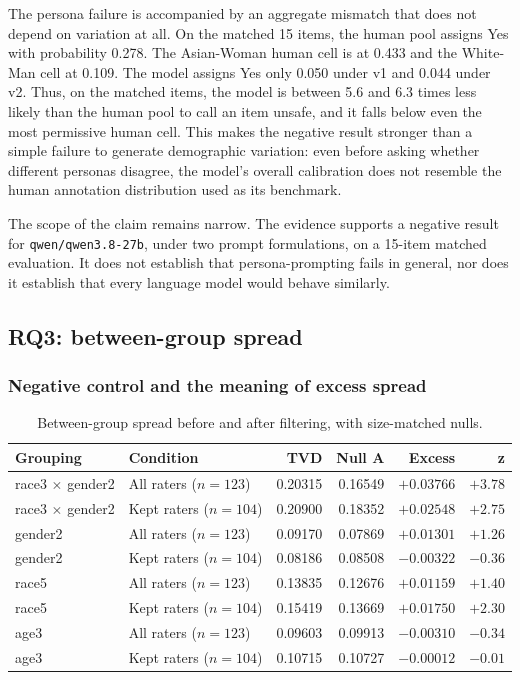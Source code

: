 \documentclass[11pt,a4paper]{article}
\begin{document}
The persona failure is accompanied by an aggregate mismatch that does not depend on variation at
all. On the matched 15 items, the human pool assigns Yes with probability 0.278. The Asian-Woman
human cell is at 0.433 and the White-Man cell at 0.109. The model assigns Yes only 0.050 under v1
and 0.044 under v2. Thus, on the matched items, the model is between 5.6 and 6.3 times less likely
than the human pool to call an item unsafe, and it falls below even the most permissive human
cell. This makes the negative result stronger than a simple failure to generate demographic
variation: even before asking whether different personas disagree, the model's overall
calibration does not resemble the human annotation distribution used as its benchmark.

The scope of the claim remains narrow. The evidence supports a negative result for
\texttt{qwen/qwen3.8-27b}, under two prompt formulations, on a 15-item matched evaluation. It
does not establish that persona-prompting fails in general, nor does it establish that every
language model would behave similarly.

\subsection{RQ3: between-group spread}

\subsubsection{Negative control and the meaning of excess spread}

\begin{table}[htbp]
\centering
\caption{Between-group spread before and after filtering, with size-matched nulls.}
\label{tab:spread}
\small\begin{tabular}{llrrrr}
\toprule
\textbf{Grouping} & \textbf{Condition} & \textbf{TVD} & \textbf{Null A} & \textbf{Excess} & \textbf{z} \\
\midrule
race3 $\times$ gender2 & All raters ($n=123$) & 0.20315 & 0.16549 & $+0.03766$ & $+3.78$ \\
race3 $\times$ gender2 & Kept raters ($n=104$) & 0.20900 & 0.18352 & $+0.02548$ & $+2.75$ \\
gender2 & All raters ($n=123$) & 0.09170 & 0.07869 & $+0.01301$ & $+1.26$ \\
gender2 & Kept raters ($n=104$) & 0.08186 & 0.08508 & $-0.00322$ & $-0.36$ \\
race5 & All raters ($n=123$) & 0.13835 & 0.12676 & $+0.01159$ & $+1.40$ \\
race5 & Kept raters ($n=104$) & 0.15419 & 0.13669 & $+0.01750$ & $+2.30$ \\
age3 & All raters ($n=123$) & 0.09603 & 0.09913 & $-0.00310$ & $-0.34$ \\
age3 & Kept raters ($n=104$) & 0.10715 & 0.10727 & $-0.00012$ & $-0.01$ \\
\bottomrule
\end{tabular}

\end{table}
\end{document}
